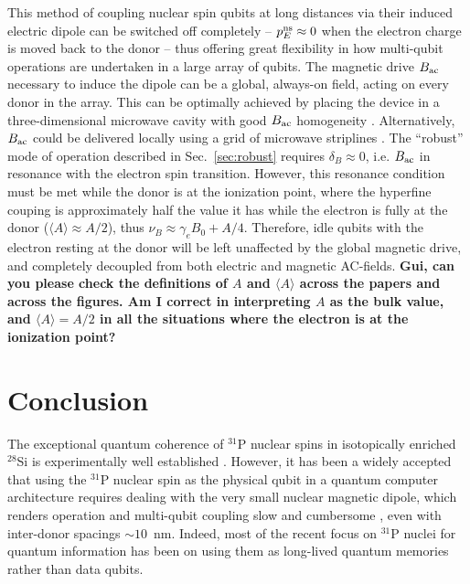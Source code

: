 \documentclass[
 aps,prb,twocolumn,
 amsmath,amssymb,superscriptaddress,
] {revtex4-1}
\begin{document}
This method of coupling nuclear spin qubits at long distances via their induced electric dipole can be switched off completely -- $p_E^{\rm ns} \approx 0$ when the electron charge is moved back to the donor -- thus offering great flexibility in how multi-qubit operations are undertaken in a large array of qubits. The magnetic drive $B_{\rm ac}$ necessary to induce the dipole can be a global, always-on field, acting on every donor in the array. This can be optimally achieved by placing the device in a three-dimensional microwave cavity with good $B_{\rm ac}$ homogeneity \cite{Angerer2016}. Alternatively, $B_{\rm ac}$ could be delivered locally using a grid of microwave striplines \cite{Li2018}. The ``robust'' mode of operation described in Sec.~\ref{sec:robust} requires $\delta_B \approx 0$, i.e. $B_{\rm ac}$ in resonance with the electron spin transition. However, this resonance condition must be met while the donor is at the ionization point, where the hyperfine couping is approximately half the value it has while the electron is fully at the donor ($\langle A\rangle \approx A/2$), thus $\nu_B \approx \gamma_e B_0 + A/4$. Therefore, idle qubits with the electron resting at the donor will be left unaffected by the global magnetic drive, and completely decoupled from both electric and magnetic AC-fields.
{\bf Gui, can you please check the definitions of $A$ and $\langle A \rangle$ across the papers and across the figures. Am I correct in interpreting $A$ as the bulk value, and $\langle A \rangle = A/2$ in all the situations where the electron is at the ionization point?}


\section{Conclusion} \label{sec:conclusion}

The exceptional quantum coherence of $^{31}$P nuclear spins in isotopically enriched $^{28}$Si is experimentally well established \cite{Saeedi2013,Muhonen2014}. However, it has been a widely accepted that using the $^{31}$P nuclear spin as the physical qubit in a quantum computer architecture requires dealing with the very small nuclear magnetic dipole, which renders operation and multi-qubit coupling slow and cumbersome \cite{Kane1998,Ogorman2016,Hill2015}, even with inter-donor spacings $\sim 10$~nm. Indeed, most of the recent focus on $^{31}$P nuclei for quantum information has been on using them as long-lived quantum memories \cite{Morton2008,Freer2017} rather than data qubits. 
\end{document}

